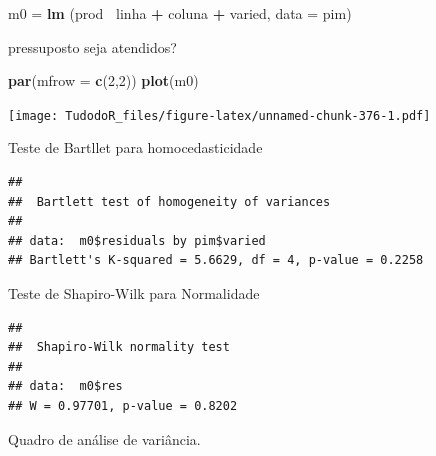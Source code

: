 \documentclass[
]{book}
\newenvironment{Shaded}{\begin{snugshade}}{\end{snugshade}}
\newcommand{\DataTypeTok}[1]{\textcolor[rgb]{0.13,0.29,0.53}{#1}}
\newcommand{\DecValTok}[1]{\textcolor[rgb]{0.00,0.00,0.81}{#1}}
\newcommand{\KeywordTok}[1]{\textcolor[rgb]{0.13,0.29,0.53}{\textbf{#1}}}
\newcommand{\NormalTok}[1]{#1}
\newcommand{\OperatorTok}[1]{\textcolor[rgb]{0.81,0.36,0.00}{\textbf{#1}}}
\newcommand{\StringTok}[1]{\textcolor[rgb]{0.31,0.60,0.02}{#1}}
\begin{document}
\begin{Shaded}
\begin{Highlighting}[]
\NormalTok{m0 =}\StringTok{ }\KeywordTok{lm}\NormalTok{ (prod }\OperatorTok{~}\NormalTok{linha }\OperatorTok{+}\StringTok{ }\NormalTok{coluna }\OperatorTok{+}\StringTok{ }\NormalTok{varied, }\DataTypeTok{data =}\NormalTok{ pim)}
\end{Highlighting}
\end{Shaded}

pressuposto seja atendidos?

\begin{Shaded}
\begin{Highlighting}[]
\KeywordTok{par}\NormalTok{(}\DataTypeTok{mfrow =} \KeywordTok{c}\NormalTok{(}\DecValTok{2}\NormalTok{,}\DecValTok{2}\NormalTok{)) }
\KeywordTok{plot}\NormalTok{(m0)}
\end{Highlighting}
\end{Shaded}

\texttt{[image: TudodoR\_files/figure-latex/unnamed-chunk-376-1.pdf]}

Teste de Bartllet para homocedasticidade

\begin{Shaded}
\end{Shaded}

\begin{verbatim}
## 
##  Bartlett test of homogeneity of variances
## 
## data:  m0$residuals by pim$varied
## Bartlett's K-squared = 5.6629, df = 4, p-value = 0.2258
\end{verbatim}

Teste de Shapiro-Wilk para Normalidade

\begin{Shaded}
\end{Shaded}

\begin{verbatim}
## 
##  Shapiro-Wilk normality test
## 
## data:  m0$res
## W = 0.97701, p-value = 0.8202
\end{verbatim}

Quadro de análise de variância.
\end{document}
